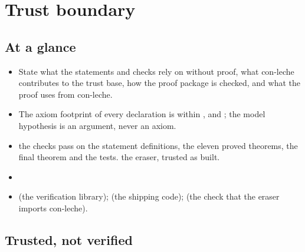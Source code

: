 \chapter{Trust boundary}\label{chap:trust}

\section*{At a glance}
\begin{itemize}
\item {} State what the statements and checks rely on without proof, what con-leche
  contributes to the trust base, how the proof package is checked, and what the proof uses from
  con-leche.
\item {} The axiom footprint of every declaration is within ,
   and ; the model hypothesis is an argument, never an
  axiom.
\item {} \stProved{} the checks pass on the statement definitions, the eleven proved theorems, the final theorem and the tests. \stShipping{} the eraser, trusted as built.
\item {} 
\item {}  (the verification library);
   (the shipping code);  (the
  check that the eraser imports con-leche).
\end{itemize}

\section{Trusted, not verified}\label{sec:trust-trusted}

